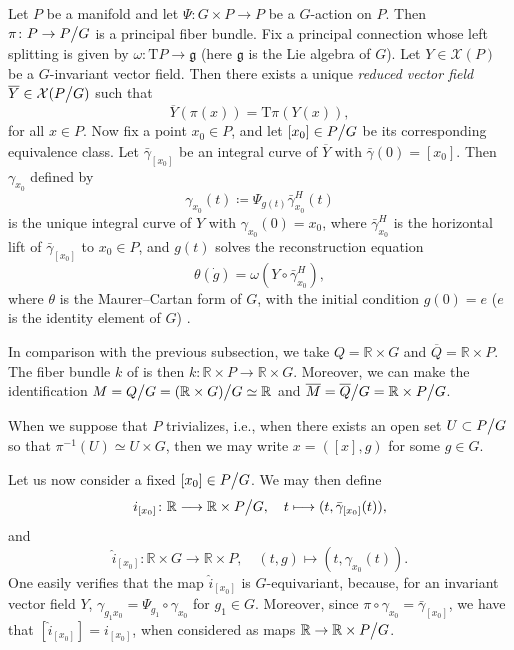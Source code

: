 \documentclass[11pt]{article}
\theoremstyle{plain}
\theoremstyle{definition}
\begin{document}
Let $P$ be a manifold and let $\Psi\colon G\times P\to P$ be a $G$-action on $P$. Then $\pi\colon P\to P\big\slash G$ is a principal fiber bundle. Fix a principal connection whose left splitting is given by $\omega\colon \mathrm{T}P\to \mathfrak{g}$ (here $\mathfrak{g}$ is the Lie algebra of $G$). Let $Y\in \mathcal{X}(P)$ be a $G$-invariant vector field. Then there exists a unique \emph{reduced vector field} $\overline{Y}\in \mathcal{X}(P\big\slash G)$ such that
\begin{equation*}\label{reducedvf}
    \overline{Y}(\pi(x))=\mathrm{T}\pi(Y(x)),
\end{equation*}
for all $x\in P$. Now fix a point $x_0\in P$, and let $[x_0]\in P\big\slash G$ be its corresponding equivalence class. Let $\bar{\gamma}_{[x_0]}$ be an integral curve of $\overline{Y}$ with $\bar{\gamma}(0)=[x_0]$. Then $\gamma_{x_0}$ defined by
\begin{equation*}
    \gamma_{x_0}(t)\coloneqq \Psi_{g(t)}\bar{\gamma}_{x_0}^H(t)
\end{equation*}
is the unique integral curve of $Y$ with $\gamma_{x_0}(0)=x_0$, where $\bar{\gamma}_{x_0}^H$ is the horizontal lift of $\bar{\gamma}_{[x_0]}$  to $x_0\in P$, and $g(t)$ solves the reconstruction equation
\begin{equation*}
    \theta(\dot{g})=\omega(Y\circ  \bar{\gamma}_{x_0}^H),
\end{equation*}
where $\theta$ is the Maurer--Cartan form of $G$, with the initial condition $g(0)=e$ ($e$ is the identity element of $G$) \cite{firstorderrec,ellis2011reconstruction}.  


In comparison with the previous subsection, we take $Q=\mathbb{R}\times G$ and $\overline Q={\mathbb R}\times P$. The fiber bundle $k$ of  is then $k\colon \mathbb{R}\times P\to \mathbb{R}\times G$. Moreover, we can make the identification $M=Q\big\slash G=(\mathbb{R}\times G)\big\slash G\simeq \mathbb{R}$ and $\overline M=\overline Q \big\slash G={\mathbb R}\times P \big\slash G$.

When we suppose that $P$ trivializes, i.e., when there exists an open set $U\subset P\big\slash G$ so that $\pi^{-1}(U)\simeq U\times G$, then we may write $x=([x],g)$ for some $g\in G$.  

Let us now consider a fixed $[x_0] \in P\big\slash G$. We may then define
\begin{equation*}
    i_{[x_0]}\colon \mathbb{R}\longrightarrow \mathbb{R}\times P\big\slash G,\quad t\longmapsto (t,\bar{\gamma}_{[x_0]}(t)),
\end{equation*}
and
\begin{equation*}
    \hat{i}_{[x_0]}\colon \mathbb{R}\times G\longrightarrow \mathbb{R}\times P,\quad (t,g)\longmapsto (t,\gamma_{x_0}(t)).
\end{equation*}
One easily verifies that the map ${\hat i}_{[x_0]}$ is $G$-equivariant, because, for an invariant vector field $Y$, $\gamma_{g_1 x_0} = \Psi_{g_1}\circ\gamma_{x_0}$ for $g_1\in G$. Moreover, since $\pi\circ\gamma_{x_0} = \bar{\gamma}_{[x_0]}$, we have that $[\hat{i}_{[x_0]}] = {i}_{[x_0]}$, when considered as maps $\mathbb{R} \to \mathbb{R} \times P\big\slash G$. 
\end{document}
